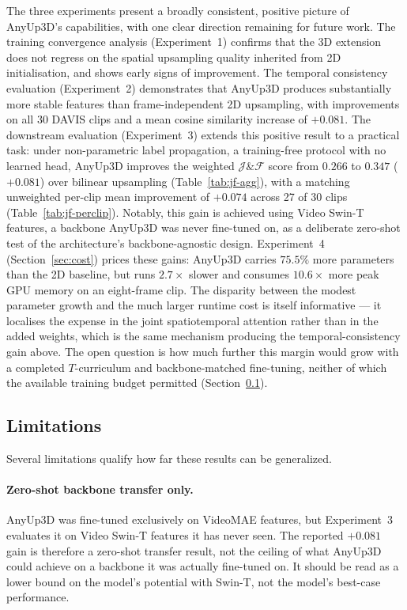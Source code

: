 The three experiments present a broadly consistent, positive picture of AnyUp3D's capabilities, with one clear direction remaining for future work.
The training convergence analysis (Experiment~1) confirms that the 3D extension does not regress on the spatial upsampling quality inherited from 2D initialisation, and shows early signs of improvement.
The temporal consistency evaluation (Experiment~2) demonstrates that AnyUp3D produces substantially more stable features than frame-independent 2D upsampling, with improvements on all 30 DAVIS clips and a mean cosine similarity increase of $+0.081$.
The downstream evaluation (Experiment~3) extends this positive result to a practical task: under non-parametric label propagation, a training-free protocol with no learned head, AnyUp3D improves the weighted $\mathcal{J}\&\mathcal{F}$ score from $0.266$ to $0.347$ ($+0.081$) over bilinear upsampling (Table~\ref{tab:jf-agg}), with a matching unweighted per-clip mean improvement of $+0.074$ across 27 of 30 clips (Table~\ref{tab:jf-perclip}).
Notably, this gain is achieved using Video Swin-T features, a backbone AnyUp3D was never fine-tuned on, as a deliberate zero-shot test of the architecture's backbone-agnostic design.
Experiment~4 (Section~\ref{sec:cost}) prices these gains: AnyUp3D carries $75.5\%$ more parameters than the 2D baseline, but runs $2.7\times$ slower and consumes $10.6\times$ more peak GPU memory on an eight-frame clip.
The disparity between the modest parameter growth and the much larger runtime cost is itself informative --- it localises the expense in the joint spatiotemporal attention rather than in the added weights, which is the same mechanism producing the temporal-consistency gain above.
The open question is how much further this margin would grow with a completed $T$-curriculum and backbone-matched fine-tuning, neither of which the available training budget permitted (Section~\ref{sec:discussion-limitations}).

\subsection{Limitations}
\label{sec:discussion-limitations}

Several limitations qualify how far these results can be generalized.

\paragraph{Zero-shot backbone transfer only.}
AnyUp3D was fine-tuned exclusively on VideoMAE features, but Experiment~3 evaluates it on Video Swin-T features it has never seen.
The reported $+0.081$ gain is therefore a zero-shot transfer result, not the ceiling of what AnyUp3D could achieve on a backbone it was actually fine-tuned on.
It should be read as a lower bound on the model's potential with Swin-T, not the model's best-case performance.

